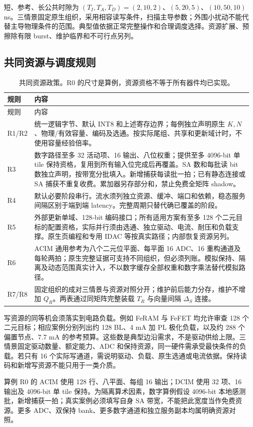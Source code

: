 

短、参考、长公共时隙为 $(T_I,T_A,T_D)=(2,10,2)$、$(5,20,5)$、$(10,50,10)$ ns。三情景固定原生组织，采用相容读写条件，扫描主导参数；外围小扰动不能代替主导物理条件的范围。典型值依据正常完整操作和合理调度选择。资源扩展、预擦除有限 burst、维护临界和不可行点另列。

\subsection{共同资源与调度规则}

\begingroup\small
\begin{longtable}{@{}p{12mm}p{143mm}@{}}
\caption{共同资源政策。R0 的尺寸是算例，资源资格不等于所有器件均已实现。}\label{tab:configuration}\\
\toprule 规则 & 内容\\\midrule\endfirsthead
\toprule 规则 & 内容\\\midrule\endhead
R1/R2 & 统一逻辑字节、默认 INT8 和上述寄存边界；每例独立声明原生 $K,N$、物理/有效容量、编码及选通。按实际尾组、共享和更新域计时，不使用容量经验倍率。\\
R3 & 数字路径至多 32 活动项、16 输出、八位权重；提供至多 4096-bit 单 tile 保持资格，复用到所有输入位完成后再覆盖。SA 数和每批读 bit 数独立声明，按带宽分批填入。新增捕获每读批一拍；已有静态连接或 SA 捕获不重复收费。累加器另存部分和，禁止免费全矩阵 shadow。\\
R4 & 默认必要阶段串行。流水须列独立资源、缓冲、端口和依赖，稳态服务间隔区别于端到端 latency。完整周期只替代确已覆盖的阶段。\\
R5 & 外部更新单域、128-bit 编码接口；所有适用方案有至多 128 个二元目标的配置资格，实际并行须由选通、独立驱动、电流、耐压和负载支撑。原生页编程和专用 IDAC 等按真实路径；内部恢复资源另列。\\
R6 & ACIM 通用参考为八个二元位平面、每平面 16 ADC、16 重构通道及每轮两拍；原生完整证据可支持不同组织，但必须列账。模拟保持、隔离及动态范围真实计入，不以数字缓存全部权重和数字乘法替代模拟路径。\\
R7/R8 & 固定组织的成对三情景与资源对照分开；维护前后能力分存，维护不增加 $Q_R$。两表通过同矩阵完整装载 $T_R$ 与向量间隔 $\Delta_S$ 连接。\\\bottomrule
\end{longtable}
\endgroup

写资源的同等机会须落实到电路负载。例如 FeRAM 与 FeFET 均允许审查 128 个二元目标；相应案例分别列出约 128 BL、4 mA 加 PL 极化负载，以及约 288 个偏置节点、7.7 mA 的参考预算。这些数是典型边沿需求，不是驱动供给上限。三情景固定驱动数量、额定能力、ADC 和保持资源，同一硬件需承受最快条件的负载。若只有 16 个实际写通道，需说明驱动、负载、原生选通或电流依据。保持读码和新增写资源不能只用于一类介质。

算例 R0 的 ACIM 使用 128 行、八平面、每组 16 输出；DCIM 使用 32 项、16 输出及 4096-bit 单 tile 保持。为隔离算术因素，数字算例假设 4096-bit 本地感测批，新增捕获一拍；真实案例必须填写自身 SA 带宽，不能把此宽度当作免费资源。更多 ADC、双保持 bank、更多数字通道和独立服务副本均属明确资源对照。
